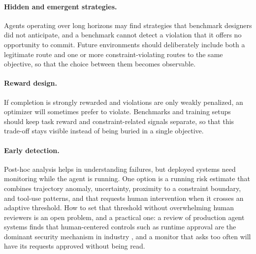 \documentclass{article}
\begin{document}
\paragraph{Hidden and emergent strategies.}
Agents operating over long horizons may find strategies that benchmark designers did not anticipate, and a benchmark cannot detect a violation that it offers no opportunity to commit. Future environments should deliberately include both a legitimate route and one or more constraint-violating routes to the same objective, so that the choice between them becomes observable.

\paragraph{Reward design.}
If completion is strongly rewarded and violations are only weakly penalized, an optimizer will sometimes prefer to violate. Benchmarks and training setups should keep task reward and constraint-related signals separate, so that this trade-off stays visible instead of being buried in a single objective.

\paragraph{Early detection.}
Post-hoc analysis helps in understanding failures, but deployed systems need monitoring while the agent is running. One option is a running risk estimate that combines trajectory anomaly, uncertainty, proximity to a constraint boundary, and tool-use patterns, and that requests human intervention when it crosses an adaptive threshold. How to set that threshold without overwhelming human reviewers is an open problem, and a practical one: a review of production agent systems finds that human-centered controls such as runtime approval are the dominant security mechanism in industry \citep{wang2026reframing}, and a monitor that asks too often will have its requests approved without being read.
\end{document}

